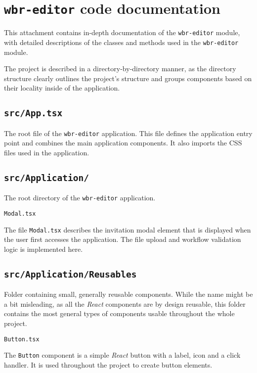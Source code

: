 \section{\texttt{wbr-editor} code documentation} \label{atta:editorCode}

This attachment contains in-depth documentation of the \texttt{wbr-editor} module, with detailed descriptions of the classes and methods
used in the \texttt{wbr-editor} module.

The project is described in a directory-by-directory manner, as the directory structure clearly outlines the project's structure and 
groups components based on their locality inside of the application.

\subsection{\texttt{src/App.tsx}}

The root file of the \texttt{wbr-editor} application.
This file defines the application entry point and combines the main application components.
It also imports the \acs{CSS} files used in the application.

\subsection{\texttt{src/Application/}}

The root directory of the \texttt{wbr-editor} application.

\emptyline
\verb|Modal.tsx|
\smallskip

The file \texttt{Modal.tsx} describes the invitation modal element that is displayed when the user first accesses the application.
The file upload and workflow validation logic is implemented here.

\subsection{\texttt{src/Application/Reusables}}

Folder containing small, generally reusable components.
While the name might be a bit misleading, as all the \textit{React} components are by design reusable, 
this folder contains the most general types of components usable throughout the whole project.

\emptyline
\verb|Button.tsx|
\smallskip

The \texttt{Button} component is a simple \textit{React} button with a label, icon and a click handler.
It is used throughout the project to create button elements.

